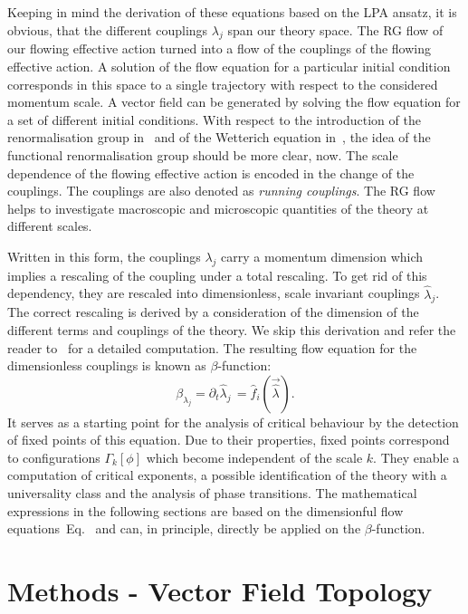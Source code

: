 \documentclass[paper=a4,11pt,bibliography=totoc]{scrartcl}
\def\eq#1{\textcolor{red!50!black}{Eq.}~\labelcref{#1}}
\begin{document}
Keeping in mind the derivation of these equations based on the LPA ansatz, it is obvious, that the different couplings $\lambda_j$ span our theory space. The RG flow of our flowing effective action turned into a flow of the couplings of the flowing effective action. A solution of the flow equation for a particular initial condition corresponds in this space to a single trajectory with respect to the considered momentum scale. A vector field can be generated by solving the flow equation for a set of different initial conditions. With respect to the introduction of the renormalisation group in~ and of the Wetterich equation in~, the idea of the functional renormalisation group should be more clear, now. The scale dependence of the flowing effective action is encoded in the change of the couplings. The couplings are also denoted as \textit{running couplings}. The RG flow helps to investigate macroscopic and microscopic quantities of the theory at different scales.

Written in this form, the couplings $\lambda_{j}$ carry a momentum dimension which implies a rescaling of the coupling under a total rescaling. To get rid of this dependency, they are rescaled into dimensionless, scale invariant couplings $\hat{\lambda}_j$. The correct rescaling is derived by a consideration of the dimension of the different terms and couplings of the theory. We skip this derivation and refer the reader to~\cite{Pawlowski2018} for a detailed computation. The resulting flow equation for the dimensionless couplings is known as $\beta$-function:
%
\begin{equation}
\label{eq:betafunction}
\beta_{\lambda_j} = \partial_t\hat{\lambda}_j\,=\hat{f}_i\left({\vec{\hat{\lambda}}}\right).
\end{equation}
%
It serves as a starting point for the analysis of critical behaviour by the detection of fixed points of this equation. Due to their properties, fixed points correspond to configurations $\Gamma_k[\phi]$ which become independent of the scale $k$. They enable a computation of critical exponents, a possible identification of the theory with a universality class and the analysis of phase transitions. The mathematical expressions in the following sections are based on the dimensionful flow equations~\eq{eq:vecflowequation} and can, in principle, directly be applied on the $\beta$-function.

\section{Methods - Vector Field Topology}
\label{sec:vft}
\end{document}
